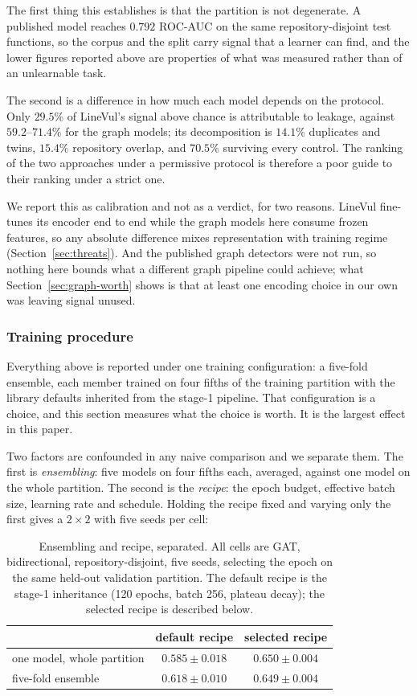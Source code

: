 \noindent The first thing this establishes is that the partition is not
degenerate. A published model reaches $0.792$ ROC-AUC on the same
repository-disjoint test functions, so the corpus and the split carry signal
that a learner can find, and the lower figures reported above are properties of
what was measured rather than of an unlearnable task.

The second is a difference in how much each model depends on the protocol.
Only $29.5\%$ of LineVul's signal above chance is attributable to leakage,
against $59.2$--$71.4\%$ for the graph models; its decomposition is $14.1\%$
duplicates and twins, $15.4\%$ repository overlap, and $70.5\%$ surviving every
control. The ranking of the two approaches under a permissive protocol is
therefore a poor guide to their ranking under a strict one.

We report this as calibration and not as a verdict, for two reasons. LineVul
fine-tunes its encoder end to end while the graph models here consume frozen
features, so any absolute difference mixes representation with training regime
(Section~\ref{sec:threats}). And the published graph detectors were not run, so
nothing here bounds what a different graph pipeline could achieve; what
Section~\ref{sec:graph-worth} shows is that at least one encoding choice in our
own was leaving signal unused.

\subsubsection{Training procedure}
\label{sec:procedure}
Everything above is reported under one training configuration: a five-fold
ensemble, each member trained on four fifths of the training partition with the
library defaults inherited from the stage-1 pipeline. That configuration is a
choice, and this section measures what the choice is worth. It is the largest
effect in this paper.

Two factors are confounded in any naive comparison and we separate them. The
first is \emph{ensembling}: five models on four fifths each, averaged, against
one model on the whole partition. The second is the \emph{recipe}: the epoch
budget, effective batch size, learning rate and schedule. Holding the recipe
fixed and varying only the first gives a $2\times2$ with five seeds per cell:

\begin{table}[h]
\centering
\caption{Ensembling and recipe, separated. All cells are GAT, bidirectional,
repository-disjoint, five seeds, selecting the epoch on the same held-out
validation partition. The default recipe is the stage-1 inheritance (120
epochs, batch 256, plateau decay); the selected recipe is described below.}
\label{tab:procedure}
\small
\begin{tabular}{lcc}
\toprule
& \textbf{default recipe} & \textbf{selected recipe} \\
\midrule
one model, whole partition & $0.585 \pm 0.018$ & $0.650 \pm 0.004$ \\
five-fold ensemble         & $0.618 \pm 0.010$ & $0.649 \pm 0.004$ \\
\bottomrule
\end{tabular}
\end{table}

